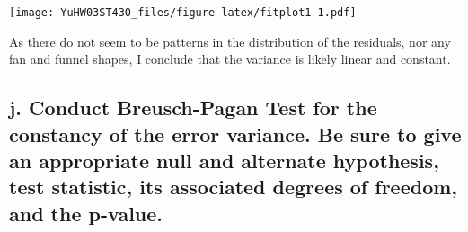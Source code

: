 \documentclass[
]{article}
\newenvironment{Shaded}{\begin{snugshade}}{\end{snugshade}}
\newcommand{\AttributeTok}[1]{\textcolor[rgb]{0.13,0.29,0.53}{#1}}
\newcommand{\DecValTok}[1]{\textcolor[rgb]{0.00,0.00,0.81}{#1}}
\newcommand{\FunctionTok}[1]{\textcolor[rgb]{0.13,0.29,0.53}{\textbf{#1}}}
\newcommand{\NormalTok}[1]{#1}
\newcommand{\OtherTok}[1]{\textcolor[rgb]{0.56,0.35,0.01}{#1}}
\newcommand{\SpecialCharTok}[1]{\textcolor[rgb]{0.81,0.36,0.00}{\textbf{#1}}}
\newcommand{\StringTok}[1]{\textcolor[rgb]{0.31,0.60,0.02}{#1}}
\begin{document}
\begin{Shaded}
\end{Shaded}

\texttt{[image: YuHW03ST430\_files/figure-latex/fitplot1-1.pdf]}

As there do not seem to be patterns in the distribution of the
residuals, nor any fan and funnel shapes, I conclude that the variance
is likely linear and constant.

\hypertarget{j.-conduct-breusch-pagan-test-for-the-constancy-of-the-error-variance.-be-sure-to-give-an-appropriate-null-and-alternate-hypothesis-test-statistic-its-associated-degrees-of-freedom-and-the-p-value.}{%
\subsection{j. Conduct Breusch-Pagan Test for the constancy of the error
variance. Be sure to give an appropriate null and alternate hypothesis,
test statistic, its associated degrees of freedom, and the
p-value.}\label{j.-conduct-breusch-pagan-test-for-the-constancy-of-the-error-variance.-be-sure-to-give-an-appropriate-null-and-alternate-hypothesis-test-statistic-its-associated-degrees-of-freedom-and-the-p-value.}}
\end{document}
